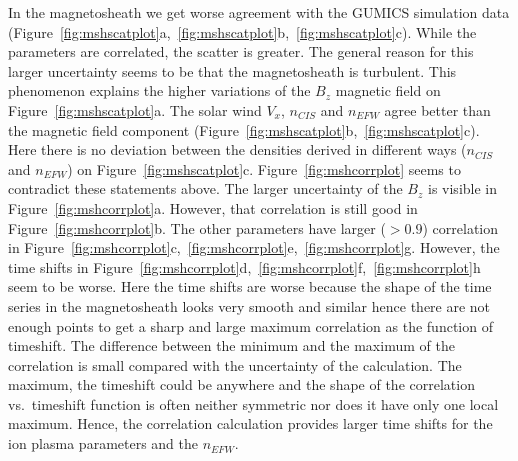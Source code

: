 \documentclass[draft]{agujournal2019}
\begin{document}
In the magnetosheath we get worse agreement with the GUMICS simulation data (Figure~\ref{fig:mshscatplot}a,~\ref{fig:mshscatplot}b,~\ref{fig:mshscatplot}c). While the parameters are correlated, the scatter is greater. The general reason for this larger uncertainty seems to be that the magnetosheath is turbulent. This phenomenon explains the higher variations of the $B_{z}$ magnetic field on Figure~\ref{fig:mshscatplot}a. The solar wind $V_{x}$, $n_{CIS}$ and $n_{EFW}$ agree better than the magnetic field component (Figure~\ref{fig:mshscatplot}b,~\ref{fig:mshscatplot}c). Here there is no deviation between the densities derived in different ways ($n_{CIS}$ and $n_{EFW}$) on Figure~\ref{fig:mshscatplot}c. Figure~\ref{fig:mshcorrplot} seems to contradict these statements above. The larger uncertainty of the $B_{z}$ is visible in Figure~\ref{fig:mshcorrplot}a. However, that correlation is still good in Figure~\ref{fig:mshcorrplot}b. The other parameters have larger ($>0.9$) correlation in Figure~\ref{fig:mshcorrplot}c,~\ref{fig:mshcorrplot}e,~\ref{fig:mshcorrplot}g. However, the time shifts in Figure~\ref{fig:mshcorrplot}d,~\ref{fig:mshcorrplot}f,~\ref{fig:mshcorrplot}h seem to be worse. Here the time shifts are worse because the shape of the time series in the magnetosheath looks very smooth and similar hence there are not enough points to get a sharp and large maximum correlation as the function of timeshift. The difference between the minimum and the maximum of the correlation is small compared with the uncertainty of the calculation. The maximum, the timeshift could be anywhere and the shape of the correlation vs.~timeshift function is often neither symmetric nor does it have only one local maximum. Hence, the correlation calculation provides larger time shifts for the ion plasma parameters and the $n_{EFW}$. 
\end{document}
